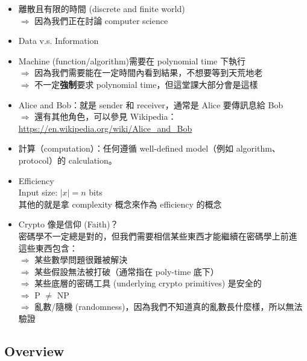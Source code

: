 \begin{itemize}[itemsep=10pt]
	\item 離散且有限的時間 (discrete and finite world) \\
		\(\Rightarrow\) 因為我們正在討論 computer science
		
	\item Data v.s. Information
	
	\item Machine (function/algorithm)需要在 polynomial time 下執行 \\
		\(\Rightarrow\) 因為我們需要能在一定時間內看到結果，不想要等到天荒地老 \\
		\(\Rightarrow\) 不一定\textbf{強制}要求 polynomial time，但這堂課大部分會是這樣
		
	\item Alice and Bob：就是 sender 和 receiver，通常是 Alice 要傳訊息給 Bob \\
		\(\Rightarrow\) 還有其他角色，可以參見 Wikipedia： \\
		\url{https://en.wikipedia.org/wiki/Alice_and_Bob}
		
	\item 計算（computation）：任何遵循 well-defined model（例如 algorithm、protocol）的 calculation。
	
	\item Efficiency \\
		Input size: \(|x| = n\) bits \\
		其他的就是拿 complexity 概念來作為 efficiency 的概念
		
	\item Crypto 像是信仰 (Faith)？ \\
		密碼學不一定總是對的，但我們需要相信某些東西才能繼續在密碼學上前進 \\
		這些東西包含： \\ 
		\(\Rightarrow\) 某些數學問題很難被解決 \\
		\(\Rightarrow\) 某些假設無法被打破（通常指在 poly-time 底下） \\
		\(\Rightarrow\) 某些底層的密碼工具 (underlying crypto primitives) 是安全的 \\
		\(\Rightarrow\) P \(\neq\) NP \\
		\(\Rightarrow\) 亂數/隨機 (randomness)，因為我們不知道真的亂數長什麼樣，所以無法驗證
\end{itemize}


\subsection{Overview}


